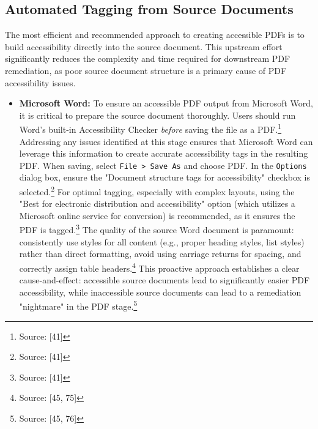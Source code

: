 \subsection{Automated Tagging from Source Documents}

The most efficient and recommended approach to creating accessible PDFs is to build accessibility directly into the source document. This upstream effort significantly reduces the complexity and time required for downstream PDF remediation, as poor source document structure is a primary cause of PDF accessibility issues.

\begin{itemize}[noitemsep,topsep=0pt]
    \item \textbf{Microsoft Word:} To ensure an accessible PDF output from Microsoft Word, it is critical to prepare the source document thoroughly. Users should run Word's built-in Accessibility Checker \textit{before} saving the file as a PDF.\footnote{Source: [41]} Addressing any issues identified at this stage ensures that Microsoft Word can leverage this information to create accurate accessibility tags in the resulting PDF. When saving, select \texttt{File > Save As} and choose PDF. In the \texttt{Options} dialog box, ensure the "Document structure tags for accessibility" checkbox is selected.\footnote{Source: [41]} For optimal tagging, especially with complex layouts, using the "Best for electronic distribution and accessibility" option (which utilizes a Microsoft online service for conversion) is recommended, as it ensures the PDF is tagged.\footnote{Source: [41]} The quality of the source Word document is paramount: consistently use styles for all content (e.g., proper heading styles, list styles) rather than direct formatting, avoid using carriage returns for spacing, and correctly assign table headers.\footnote{Source: [45, 75]} This proactive approach establishes a clear cause-and-effect: accessible source documents lead to significantly easier PDF accessibility, while inaccessible source documents can lead to a remediation "nightmare" in the PDF stage.\footnote{Source: [45, 76]}

\end{itemize}
